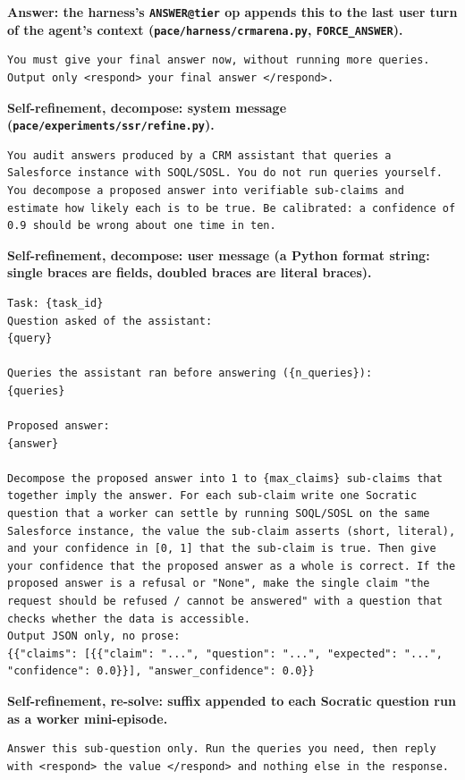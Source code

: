 \documentclass[10pt]{article}
\newcommand{\code}[1]{\texttt{#1}}
\newcommand{\prompttitle}[1]{\par\vspace{7pt}\noindent\textbf{#1}\par\nopagebreak\vspace{3pt}}
\begin{document}
\prompttitle{Answer: the harness's \code{ANSWER@tier} op appends this to the last user turn of the agent's context (\code{pace/harness/crmarena.py}, \code{FORCE\_ANSWER}).}
\begin{lstlisting}
You must give your final answer now, without running more queries. Output only <respond> your final answer </respond>.
\end{lstlisting}

\prompttitle{Self-refinement, decompose: system message (\code{pace/experiments/ssr/refine.py}).}
\begin{lstlisting}
You audit answers produced by a CRM assistant that queries a Salesforce instance with SOQL/SOSL. You do not run queries yourself. You decompose a proposed answer into verifiable sub-claims and estimate how likely each is to be true. Be calibrated: a confidence of 0.9 should be wrong about one time in ten.
\end{lstlisting}

\prompttitle{Self-refinement, decompose: user message (a Python format string: single braces are fields, doubled braces are literal braces).}
\begin{lstlisting}
Task: {task_id}
Question asked of the assistant:
{query}

Queries the assistant ran before answering ({n_queries}):
{queries}

Proposed answer:
{answer}

Decompose the proposed answer into 1 to {max_claims} sub-claims that together imply the answer. For each sub-claim write one Socratic question that a worker can settle by running SOQL/SOSL on the same Salesforce instance, the value the sub-claim asserts (short, literal), and your confidence in [0, 1] that the sub-claim is true. Then give your confidence that the proposed answer as a whole is correct. If the proposed answer is a refusal or "None", make the single claim "the request should be refused / cannot be answered" with a question that checks whether the data is accessible.
Output JSON only, no prose:
{{"claims": [{{"claim": "...", "question": "...", "expected": "...", "confidence": 0.0}}], "answer_confidence": 0.0}}
\end{lstlisting}

\prompttitle{Self-refinement, re-solve: suffix appended to each Socratic question run as a worker mini-episode.}
\begin{lstlisting}
Answer this sub-question only. Run the queries you need, then reply with <respond> the value </respond> and nothing else in the response.
\end{lstlisting}
\end{document}
